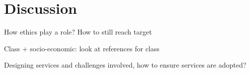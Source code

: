 \section{Discussion}

\begin{comment}
Depends on what the nature of your study was, but you might either leave the reader with design recommendations for the context you studied (e.g., how could HCI address the lives of young women in rural West Bengal facing constant threats to their safety) or else discuss the main takeaways for your desired readers of this paper (ICTD researchers? Other HCI researchers? Practitioners?). This needs thought and work. You need a week just to think about and iterate on the Discussion. Do not take this lightly. If you are taking on a particular theoretical lens, you will need to deeply engage with this lens through the Discussion. 
\end{comment}

\textcolor{red}{}

How ethics play a role? How to still reach target

Class + socio-economic: look at references for class

Designing services and challenges involved, how to ensure services are adopted?
